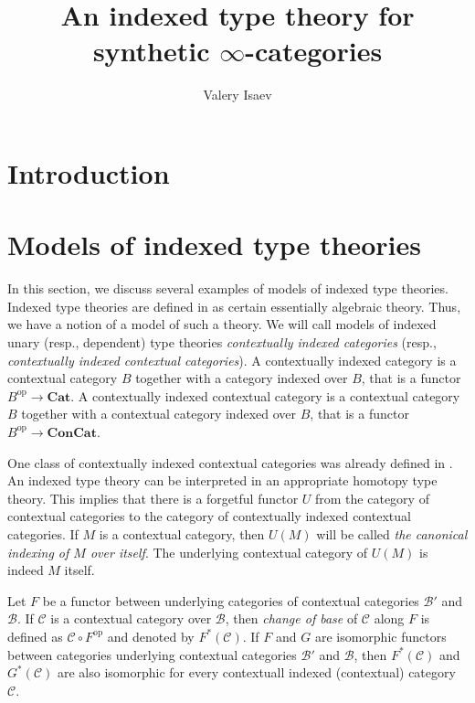 \documentclass[reqno]{amsart}
\theoremstyle{definition}
\theoremstyle{remark}
\newcommand{\fs}[1]{\mathrm{#1}}
\newcommand{\cat}[1]{\mathbf{#1}}
\newcommand{\scat}[1]{\mathcal{#1}}
\numberwithin{figure}{section}
\begin{document}
\title{An indexed type theory for synthetic $\infty$-categories}

\author{Valery Isaev}

\begin{abstract}
\end{abstract}

\maketitle

\section{Introduction}


\section{Models of indexed type theories}

In this section, we discuss several examples of models of indexed type theories.
Indexed type theories are defined in \cite{indexed-tt} as certain essentially algebraic theory.
Thus, we have a notion of a model of such a theory.
We will call models of indexed unary (resp., dependent) type theories \emph{contextually indexed categories} (resp., \emph{contextually indexed contextual categories}).
A contextually indexed category is a contextual category $B$ together with a category indexed over $B$, that is a functor $B^\fs{op} \to \cat{Cat}$.
A contextually indexed contextual category is a contextual category $B$ together with a contextual category indexed over $B$, that is a functor $B^\fs{op} \to \cat{ConCat}$.

One class of contextually indexed contextual categories was already defined in \cite{indexed-tt}.
An indexed type theory can be interpreted in an appropriate homotopy type theory.
This implies that there is a forgetful functor $U$ from the category of contextual categories to the category of contextually indexed contextual categories.
If $M$ is a contextual category, then $U(M)$ will be called \emph{the canonical indexing of $M$ over itself}.
The underlying contextual category of $U(M)$ is indeed $M$ itself.

Let $F$ be a functor between underlying categories of contextual categories $\scat{B}'$ and $\scat{B}$.
If $\scat{C}$ is a contextual category over $\scat{B}$, then \emph{change of base} of $\scat{C}$ along $F$ is defined as $\scat{C} \circ F^\fs{op}$ and denoted by $F^*(\scat{C})$.
If $F$ and $G$ are isomorphic functors between categories underlying contextual categories $\scat{B}'$ and $\scat{B}$, then $F^*(\scat{C})$ and $G^*(\scat{C})$ are also isomorphic for every contextuall indexed (contextual) category $\scat{C}$.
\end{document}
